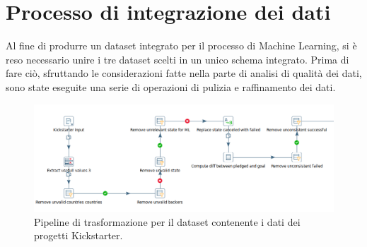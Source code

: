 \newpage
\section{Processo di integrazione dei dati}
Al fine di produrre un dataset integrato per il processo di Machine Learning, si è reso necessario unire i tre dataset scelti in un unico schema integrato. Prima di fare ciò, sfruttando le considerazioni fatte nella parte di analisi di qualità dei dati, sono state eseguite una serie di operazioni di pulizia e raffinamento dei dati.\\

\begin{figure}
	\hspace*{-1cm}%
	\includegraphics[width=\dimexpr\textwidth+2cm\relax]{images/transformation_kick}%
	\hspace*{-1cm}%
	\caption{Pipeline di trasformazione per il dataset contenente i dati dei progetti Kickstarter.}
	\label{fig:transformationkick}
\end{figure}

